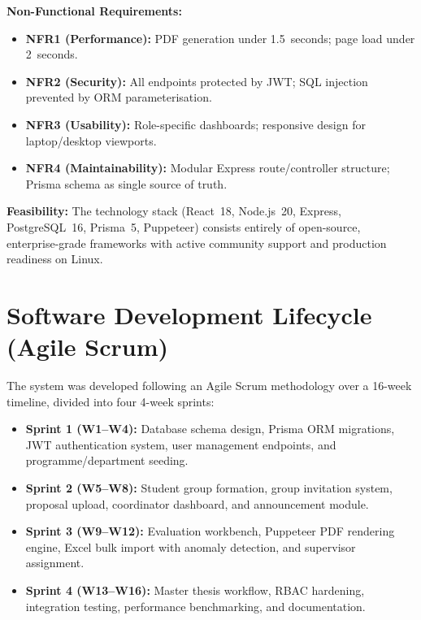\documentclass[12pt]{report}
\begin{document}
\textbf{Non-Functional Requirements:}
\begin{itemize}[leftmargin=1.5cm]
    \item \textbf{NFR1 (Performance):} PDF generation under 1.5~seconds; page load
          under 2~seconds.
    \item \textbf{NFR2 (Security):} All endpoints protected by JWT; SQL injection
          prevented by ORM parameterisation.
    \item \textbf{NFR3 (Usability):} Role-specific dashboards; responsive design for
          laptop/desktop viewports.
    \item \textbf{NFR4 (Maintainability):} Modular Express route/controller structure;
          Prisma schema as single source of truth.
\end{itemize}

\textbf{Feasibility:} The technology stack (React~18, Node.js~20, Express,
PostgreSQL~16, Prisma~5, Puppeteer) consists entirely of open-source, enterprise-grade
frameworks with active community support and production readiness on Linux.

\section{Software Development Lifecycle (Agile Scrum)}
The system was developed following an Agile Scrum methodology over a 16-week timeline,
divided into four 4-week sprints:
\begin{itemize}[leftmargin=1.5cm]
    \item \textbf{Sprint 1 (W1--W4):} Database schema design, Prisma ORM migrations,
          JWT authentication system, user management endpoints, and programme/department
          seeding.
    \item \textbf{Sprint 2 (W5--W8):} Student group formation, group invitation system,
          proposal upload, coordinator dashboard, and announcement module.
    \item \textbf{Sprint 3 (W9--W12):} Evaluation workbench, Puppeteer PDF rendering
          engine, Excel bulk import with anomaly detection, and supervisor assignment.
    \item \textbf{Sprint 4 (W13--W16):} Master thesis workflow, RBAC hardening,
          integration testing, performance benchmarking, and documentation.
\end{itemize}
\end{document}
